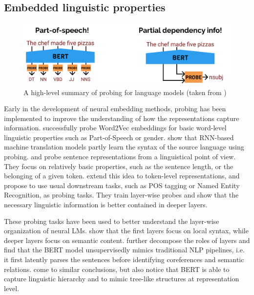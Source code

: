 \subsection{Embedded linguistic properties}
\begin{figure}[ht]
    \centering
    \includegraphics[width=0.7\linewidth]{sources/related_works/imgs/probing-diagram.png}
    \caption{A high-level summary of probing for language models (taken from \citet{Hewitt_2019})}
    \label{fig:probing}
\end{figure}



Early in the development of neural embedding methods, probing has been implemented to improve the understanding of how the representations capture information. \citet{kohn-2015-whats} successfully probe Word2Vec embeddings for basic word-level linguistic properties such as Part-of-Speech or gender. \citet{shi-etal-2016-string} show that RNN-based machine translation models partly learn the syntax of the source language using probing. \citet{adi2017finegrained} and \citet{conneau-etal-2018-cram} probe sentence representations from a linguistical point of view. They focus on relatively basic properties, such as the sentence length, or the belonging of a given token. \citet{liu-etal-2019-linguistic} extend this idea to token-level representations, and propose to use usual downstream tasks, such as POS tagging or Named Entity Recognition, as probing tasks. They train layer-wise probes and show that the necessary linguistic information is better contained in deeper layers.

These probing tasks have been used to better understand the layer-wise organization of neural LMs. \citet{peters-etal-2018-dissecting} show that the first layers focus on local syntax, while deeper layers focus on semantic content. \citet{tenney-etal-2019-bert} further decompose the roles of layers and find that the BERT model unsupervisedly mimics traditional NLP pipelines, i.e. it first latently parses the sentences before identifying coreferences and semantic relations. \citet{jawahar-etal-2019-bert} come to similar conclusions, but also notice that BERT is able to capture linguistic hierarchy and to mimic tree-like structures at representation level.



